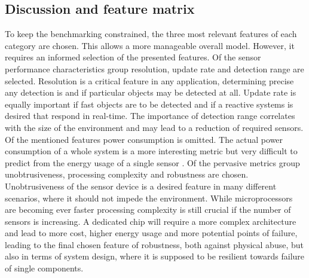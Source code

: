 \subsection{Discussion and feature matrix}
To keep the benchmarking constrained, the three most relevant features of each category are chosen. This allows a more manageable overall model. However, it requires an informed  selection of the presented features. Of the sensor performance characteristics group resolution, update rate and detection range are selected. Resolution is a critical feature in any application, determining precise any detection is and if particular objects may be detected at all. Update rate is equally important if fast objects are to be detected and if a reactive systems is desired that respond in real-time. The importance of detection range correlates with the size of the environment and may lead to a reduction of required sensors. Of the mentioned features  power consumption is omitted. The actual power consumption of a whole system is a more interesting metric but very difficult to predict from the energy usage of a single sensor \cite{landsiedel2005accurate}. Of the pervasive metrics group unobtrusiveness, processing complexity and robustness are chosen. Unobtrusiveness of the sensor device is a desired feature in many different scenarios, where it should not impede the environment. While microprocessors are becoming ever faster processing complexity is still crucial if the number of sensors is increasing. A dedicated chip will require a more complex architecture and lead to more cost, higher energy usage and more potential points of failure, leading to the final chosen feature of robustness, both against physical abuse, but also in terms of system design, where it is supposed to be resilient towards failure of single components. 

